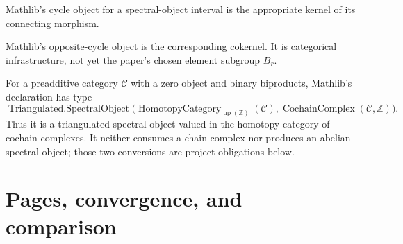 \begin{definition}
  \label{def:mathlib-spectral-object-cycles}
  \mathlibok
  Mathlib's cycle object for a spectral-object interval is the appropriate
  kernel of its connecting morphism.
\end{definition}

\begin{definition}
  \label{def:mathlib-spectral-object-opcycles}
  \mathlibok
  Mathlib's opposite-cycle object is the corresponding cokernel.  It is
  categorical infrastructure, not yet the paper's chosen element subgroup
  $B_r$.
\end{definition}

\begin{definition}
  \label{def:mathlib-mapping-cone-spectral-object}
  \mathlibok
  For a preadditive category $\mathcal C$ with a zero object and binary
  biproducts, Mathlib's declaration has type
  \[
    \operatorname{Triangulated.SpectralObject}
      \bigl(\operatorname{HomotopyCategory}_{\operatorname{up}(\mathbb Z)}
      (\mathcal C),\operatorname{CochainComplex}(\mathcal C,\mathbb Z)\bigr).
  \]
  Thus it is a triangulated spectral object valued in the homotopy category of
  cochain complexes.  It neither consumes a chain complex nor produces an
  abelian spectral object; those two conversions are project obligations below.
\end{definition}

\section{Pages, convergence, and comparison}

